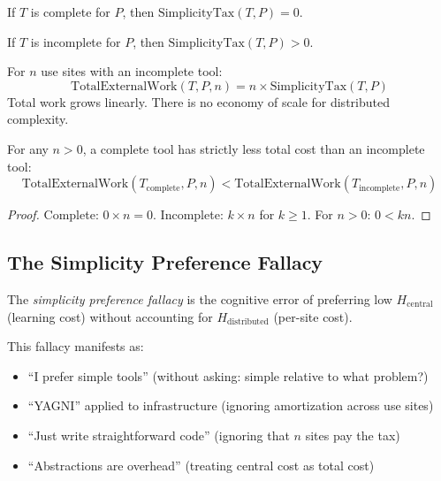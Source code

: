 \begin{theorem}\label{thm:complete-no-tax}
If $T$ is complete for $P$, then $\text{SimplicityTax}(T, P) = 0$.
\end{theorem}

\begin{theorem}\label{thm:incomplete-positive-tax}
If $T$ is incomplete for $P$, then $\text{SimplicityTax}(T, P) > 0$.
\end{theorem}

\begin{theorem}\label{thm:tax-grows}
For $n$ use sites with an incomplete tool:
\[\text{TotalExternalWork}(T, P, n) = n \times \text{SimplicityTax}(T, P)\]
Total work grows linearly. There is no economy of scale for distributed complexity.
\end{theorem}

\begin{theorem}\label{thm:complete-dominates}
For any $n > 0$, a complete tool has strictly less total cost than an incomplete tool:
\[\text{TotalExternalWork}(T_{\text{complete}}, P, n) < \text{TotalExternalWork}(T_{\text{incomplete}}, P, n)\]
\end{theorem}

\begin{proof}
Complete: $0 \times n = 0$. Incomplete: $k \times n$ for $k \geq 1$. For $n > 0$: $0 < kn$.
\end{proof}

\subsection{The Simplicity Preference Fallacy}\label{sec:fallacy}

\begin{definition}
The \emph{simplicity preference fallacy} is the cognitive error of preferring low $H_{\text{central}}$ (learning cost) without accounting for $H_{\text{distributed}}$ (per-site cost).
\end{definition}

This fallacy manifests as:
\begin{itemize}
\item ``I prefer simple tools'' (without asking: simple relative to what problem?)
\item ``YAGNI'' applied to infrastructure (ignoring amortization across use sites)
\item ``Just write straightforward code'' (ignoring that $n$ sites pay the tax)
\item ``Abstractions are overhead'' (treating central cost as total cost)
\end{itemize}

